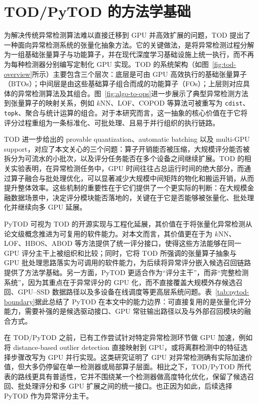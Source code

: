 \section{TOD/PyTOD 的方法学基础}

为解决传统异常检测算法难以直接迁移到 GPU 并高效扩展的问题，TOD 提出了一种面向异常检测系统的张量化抽象方法。它的关键做法，是将异常检测过程分解为一组基础张量算子与功能算子，并在现代深度学习基础设施上统一执行，而不再为每种检测器分别编写定制化 GPU 实现\citep{zhao2022tod}。TOD 的系统架构（如图~\ref{fig:tod-overview}所示）主要包含三个层次：底层是可由 GPU 高效执行的基础张量算子（BTOs）；中间层是由这些基础算子组合而成的功能算子（FOs）；上层则对应具体的异常检测算法及其组合。图~\ref{fig:algo-to-ops}进一步展示了典型异常检测方法到张量算子的映射关系，例如 $k$NN、LOF、COPOD 等算法可被重写为 \texttt{cdist}、\texttt{topk}、聚合与统计运算的组合\citep{zhao2022tod}。对于本研究而言，这一抽象的核心价值在于它将评分过程重组为一条标准化、可批处理、且易于并行组织的执行链路。

TOD 进一步给出的 provable quantization、automatic batching 以及 multi-GPU support\citep{zhao2022tod}，对应了本文关心的三个问题：算子开销能否被压缩，大规模评分能否被拆分为可流水的小批次，以及评分任务能否在多个设备之间继续扩展。TOD 的相关实验表明，在异常检测任务中，GPU 时间往往占总运行时间的绝大部分，而通过算子融合与批处理优化，可以显著减少大规模中间矩阵的物化和搬运开销，从而提升整体效率\citep{zhao2022tod}。这些机制的重要性在于它们提供了一个更实际的判断：在大规模金融数据场景中，决定评分模块能否落地的，关键在于它是否能够被张量化、批处理化并继续向多 GPU 延展。

PyTOD 可视为 TOD 的开源实现与工程化延展，其价值在于将张量化异常检测从论文级概念推进为可复用的软件能力。对本文而言，其价值更在于为 $k$NN、LOF、HBOS、ABOD 等方法提供了统一评分接口，使得这些方法能够在同一 GPU 评分主干上被组织和比较；同时，它将 TOD 所强调的张量算子抽象与 GPU 批处理思路落实为可调用的软件能力，为后续将异常评分嵌入候选召回链路提供了方法学基础。另一方面，PyTOD 更适合作为“评分主干”，而非“完整检测系统”，因为其重点在于异常评分的 GPU 化，而不直接覆盖大规模外存候选召回、GPU--SSD 数据路径以及多设备在线调度等更高层系统问题。表~\ref{tab:pytod-boundary}据此总结了 PyTOD 在本文中的能力边界：可直接复用的是张量化评分能力，需要补强的是候选驱动接口、GPU 常驻输出路径以及与外部召回模块的融合方式。

在 TOD/PyTOD 之前，已有工作尝试针对特定异常检测环节做 GPU 加速，例如将 distance-based outlier detection 直接映射到 GPU，或将离群检测中的特征选择步骤改写为 GPU 并行实现\citep{angiulli2013gpuoutlier,azmandian2014gpufeature}。这类研究证明了 GPU 对异常检测确有实际加速价值，但大多仍停留在单一检测器或局部算子层面。相比之下，TOD/PyTOD 所代表的路线更具有普适性，它并不围绕某一个检测器做高度特化优化，保留了候选召回、批处理评分和多 GPU 扩展之间的统一接口。也正因为如此，后续选择 PyTOD 作为异常评分主干。

